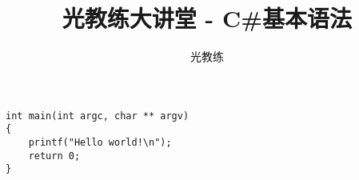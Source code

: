\documentclass[11pt, a4paper]{article}
\begin{document}
\begin{CJK}{UTF8}{song}
\lstset{numbers=left,
numberstyle=\tiny,
frame=shadowbox,
}
\title{光教练大讲堂 - C\#基本语法}
\author{光教练}
\maketitle
\begin{lstlisting}[language={[ANSI]C++}]
int main(int argc, char ** argv)
{
    printf("Hello world!\n");
    return 0;
}
\end{lstlisting}
\end{CJK}
\end{document}
